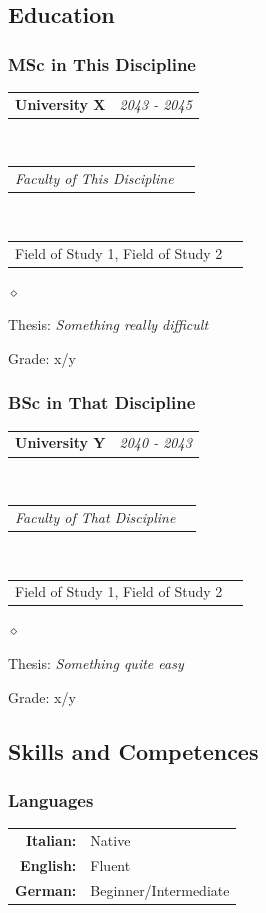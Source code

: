 \documentclass[a4paper]{article}
\makeatletter
\newlength{\sectsep}
\newcommand{\headerrow}[2]
{\begin{tabular*}{\textwidth}{l@{\extracolsep{\fill}}r}
	#1 &
	#2 \\
\end{tabular*}}
\renewenvironment{itemize}{
  \begin{list}{$\diamond$}{
    \setlength{\topsep}{0.25em}
    \setlength{\itemsep}{0em}
    \setlength{\parskip}{0pt}
    \setlength{\parsep}{0em}
  }
}{
  \end{list}
}
\makeatother
\begin{document}
      \subsection*{Education}
      \subsubsection*{MSc in This Discipline}
      \headerrow
  		{\textbf{University X}}{\emph{2043 - 2045}}
      \\
      \headerrow
        {\emph{Faculty of This Discipline}}{}
      \\
      \headerrow
        {Field of Study 1, Field of Study 2}{}

      \begin{itemize}
          \item Thesis: \emph{Something really difficult}
          \item Grade: x/y
      \end{itemize}

      \subsubsection*{BSc in That Discipline}
      \headerrow
  		{\textbf{University Y}}{\emph{2040 - 2043}}
      \\
      \headerrow
        {\emph{Faculty of That Discipline}}{}
      \\
      \headerrow
        {Field of Study 1, Field of Study 2}{}

      \begin{itemize}
          \item Thesis: \emph{Something quite easy}
          \item Grade: x/y
      \end{itemize}
      \vfill

      \subsection*{Skills and Competences}
      \subsubsection*{Languages}
      \begin{tabular}{rl}
        \textbf{Italian:}&Native\\
        \textbf{English:}&Fluent\\
        \textbf{German:}&Beginner/Intermediate\\
      \end{tabular} \vspace{1.5ex} \\
\end{document}
